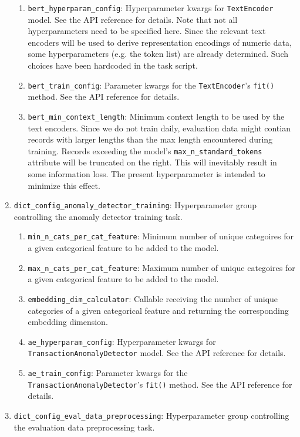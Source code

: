 \documentclass[a4paper, 10pt]{article}
\theoremstyle{plain}
\theoremstyle{definition}
\numberwithin{equation}{section}
\begin{document}
\begin{enumerate}
\begin{enumerate}
              \item \texttt{bert\_hyperparam\_config}: Hyperparameter kwargs for \texttt{TextEncoder} model. See the API reference for details. Note that not all hyperparameters need to be specified here. Since the relevant text encoders will be used to derive representation encodings of numeric data, some hyperparameters (e.g. the token list) are already determined. Such choices have been hardcoded in the task script.
              \item \texttt{bert\_train\_config}: Parameter kwargs for the \texttt{TextEncoder}'s \texttt{fit()} method. See the API reference for details.
              \item \texttt{bert\_min\_context\_length}: Minimum context length to be used by the text encoders. Since we do not train daily, evaluation data might contian records with larger lengths than the max length encountered during training. Records exceeding the model's \texttt{max\_n\_standard\_tokens} attribute will be truncated on the right. This will inevitably result in some information loss. The present hyperparameter is intended to minimize this effect.
          \end{enumerate}
    \item \texttt{dict\_config\_anomaly\_detector\_training}: Hyperparameter group controlling the anomaly detector training task.
          \begin{enumerate}
              \item \texttt{min\_n\_cats\_per\_cat\_feature}:  Minimum number of unique categoires for a given categorical feature to be added to the model.
              \item \texttt{max\_n\_cats\_per\_cat\_feature}: Maximum number of unique categoires for a given categorical feature to be added to the model.
              \item \texttt{embedding\_dim\_calculator}: Callable receiving the number of unique categories of a given categorical feature and returning the corresponding embedding dimension.
              \item \texttt{ae\_hyperparam\_config}: Hyperparameter kwargs for \texttt{TransactionAnomalyDetector} model. See the API reference for details.
              \item \texttt{ae\_train\_config}: Parameter kwargs for the \texttt{TransactionAnomalyDetector}'s \texttt{fit()} method. See the API reference for details.
          \end{enumerate}
    \item \texttt{dict\_config\_eval\_data\_preprocessing}: Hyperparameter group controlling the evaluation data preprocessing task.

\end{enumerate}
\end{document}
